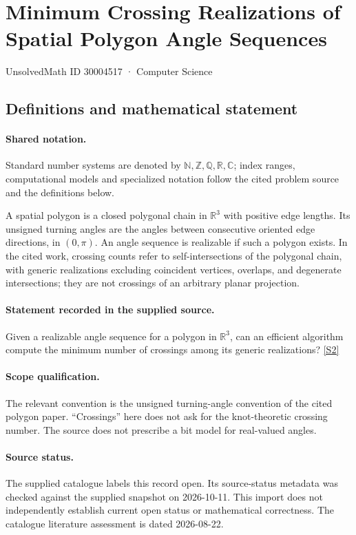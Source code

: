 \documentclass[11pt]{article}
\newcommand{\sref}[2]{\hyperlink{source:#1:#2}{[S#2]}}
\begin{document}
\setcounter{section}{30004516}
\section{Minimum Crossing Realizations of Spatial Polygon Angle Sequences}\label{30004517}
{\small\sffamily UnsolvedMath ID 30004517 · Computer Science}
\subsection{Definitions and mathematical statement}

\paragraph{Shared notation.}Standard number systems are denoted by $\mathbb N,\mathbb Z,\mathbb Q,\mathbb R,\mathbb C$; index ranges, computational models and specialized notation follow the cited problem source and the definitions below.


A spatial polygon is a closed polygonal chain in $\mathbb R^3$ with positive edge lengths. Its unsigned turning angles are the angles between consecutive oriented edge directions, in $(0,\pi)$. An angle sequence is realizable if such a polygon exists. In the cited work, crossing counts refer to self-intersections of the polygonal chain, with generic realizations excluding coincident vertices, overlaps, and degenerate intersections; they are not crossings of an arbitrary planar projection.
\paragraph{Statement recorded in the supplied source.}
Given a realizable angle sequence for a polygon in $\mathbb{R}^3$, can an efficient algorithm compute the minimum number of crossings among its generic realizations? \sref{30004517}{2}
\paragraph{Scope qualification.}
The relevant convention is the unsigned turning-angle convention of the cited polygon paper. ``Crossings'' here does not ask for the knot-theoretic crossing number. The source does not prescribe a bit model for real-valued angles.
\paragraph{Source status.}
The supplied catalogue labels this record open. Its source-status metadata was checked against the supplied snapshot on 2026-10-11. This import does not independently establish current open status or mathematical correctness. The catalogue literature assessment is dated 2026-08-22.
\end{document}
